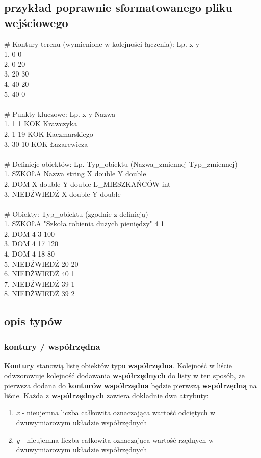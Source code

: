 \documentclass[hidelinks,10pt,a4paper]{article}
\begin{document}
\subsection{przykład poprawnie sformatowanego pliku wejściowego}
\# Kontury terenu (wymienione w kolejności łączenia): Lp. x y
\\1. 0 0
\\2. 0 20
\\3. 20 30
\\4. 40 20
\\5. 40 0
\\
\\
\# Punkty kluczowe: Lp. x y Nazwa
\\1. 1 1 KOK Krawczyka
\\2. 1 19 KOK Kaczmarskiego
\\3. 30 10 KOK Łazarewicza
\\
\\
\# Definicje obiektów: Lp. Typ\_obiektu (Nazwa\_zmiennej Typ\_zmiennej)
\\1. SZKOŁA Nazwa string X double Y double
\\2. DOM X double Y double L\_MIESZKAŃCÓW int
\\3. NIEDŹWIEDŹ X double Y double
\\
\\
\# Obiekty: Typ\_obiektu (zgodnie z definicją)
\\1. SZKOŁA "Szkoła robienia dużych pieniędzy" 4 1
\\2. DOM 4 3 100
\\3. DOM 4 17 120
\\4. DOM 4 18 80
\\5. NIEDŹWIEDŹ 20 20
\\6. NIEDŹWIEDŹ 40 1
\\7. NIEDŹWIEDŹ 39 1
\\8. NIEDŹWIEDŹ 39 2
\\
\subsection{opis typów}


\subsubsection{kontury / współrzędna}
\textbf{Kontury} stanowią listę obiektów typu \textbf{współrzędna}.
Kolejność w liście odwzorowuje kolejność dodawania \textbf{współrzędnych} do listy w ten sposób, że pierwsza dodana do \textbf{konturów} \textbf{współrzędna} będzie pierwszą \textbf{współrzędną} na liście. Każda z \textbf{współrzędnych} zawiera dokładnie dwa atrybuty:
\begin{enumerate}
\item \textit{x} - nieujemna liczba całkowita oznaczająca wartość odciętych w dwuwymiarowym układzie współrzędnych
\item \textit{y} - nieujemna liczba całkowita oznaczająca wartość rzędnych w dwuwymiarowym układzie współrzędnych
\end{enumerate}
\end{document}
